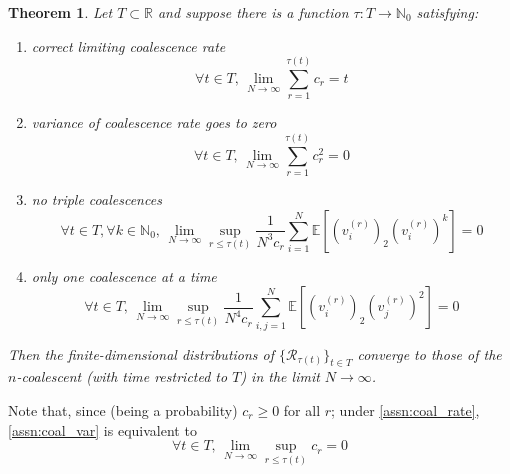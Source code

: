 \documentclass{article}
\newcommand{\E}{\mathbb{E}}
\newtheorem{thm}{Theorem}
\begin{document}
\begin{thm}
Let $T \subset \mathbb{R}$ and suppose there is a function $\tau : T \to \mathbb{N}_0$ satisfying:
\begin{enumerate}[label=(\Alph*)]
\item\label{assn:coal_rate} correct limiting coalescence rate
\begin{equation*}
\forall t \in T, \,\lim_{N\to\infty} \sum_{r=1}^{\tau(t)} c_r =t
\end{equation*}
\item\label{assn:coal_var} variance of coalescence rate goes to zero
\begin{equation*}
\forall t \in T, \,\lim_{N\to\infty} \sum_{r=1}^{\tau(t)} c_r^2 =0
\end{equation*}
\item\label{assn:triple_coal} no triple coalescences
\begin{equation*}
\forall t \in T, \forall k\in\mathbb{N}_0,\, \lim_{N\to\infty} \sup_{r\leq\tau(t)} \frac{1}{N^3 c_r} \sum_{i=1}^N \E\left[ (v_i^{(r)})_2 (v_i^{(r)})^k \right] =0
\end{equation*}
\item\label{assn:multi_coal} only one coalescence at a time
\begin{equation*}
\forall t \in T,\, \lim_{N\to\infty} \sup_{r\leq\tau(t)} \frac{1}{N^4 c_r} \sum_{i,j=1}^N \E\left[ (v_i^{(r)})_2 (v_j^{(r)})^2 \right] =0
\end{equation*}
\end{enumerate}
Then the finite-dimensional distributions of $\{\mathcal{R}_{\tau(t)}\}_{t\in T}$ converge to those of the $n$-coalescent (with time restricted to $T$) in the limit $N\to\infty$.
\end{thm}
Note that, since (being a probability) $c_r \geq 0$ for all $r$; under \ref{assn:coal_rate}, \ref{assn:coal_var} is equivalent to
\begin{equation}
\forall t \in T,\, \lim_{N\to\infty} \sup_{r\leq\tau(t)} c_r =0
\end{equation}
\end{document}
